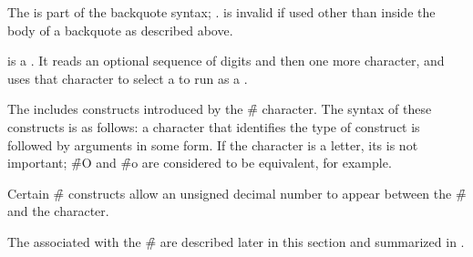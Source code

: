 \endsubsubsection%

\endsubsection%


           
The  is part of the backquote syntax; \seesection\Backquote.
 is invalid if used other than inside the body of a 
backquote  as described above.

\endsubsection%



 is a  .
It reads an optional 
sequence of digits and then one more character,
and uses that character to select a  to run as a
.

The  includes constructs introduced by the \f{\#} character.
The syntax of these constructs is as follows:
a character that identifies the type of construct is 
followed by arguments in some form.
If the character is a letter, its  is not important;
\f{\#O} and \f{\#o} are considered to be equivalent, for example.

Certain \f{\#} constructs allow an unsigned decimal number to appear
between the \f{\#} and the character.

The  associated with the  \f{\#}
are described later in this section and summarized in \thenextfigure.


